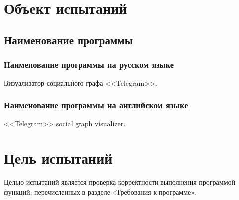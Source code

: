 \section{Объект испытаний}

\subsection{Наименование программы}

\subsubsection{Наименование программы на русском языке}

Визуализатор социального графа <<Telegram>>.

\subsubsection{Наименование программы на английском языке}

<<Telegram>> social graph visualizer.

\section{Цель испытаний}

Целью испытаний является проверка корректности выполнения программой функций, перечисленных в разделе «Требования к программе».
